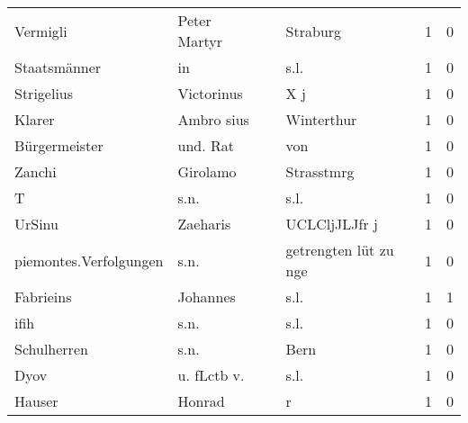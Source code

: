\begin{tabular}{llllrr}
                 Vermigli &                       Peter Martyr &             &                                    Straburg &          1 &         0 \\
             Staatsmänner &                                 in &             &                                        s.l. &          1 &         0 \\
               Strigelius &                         Victorinus &             &                                         X j &          1 &         0 \\
                   Klarer &                         Ambro sius &             &                                  Winterthur &          1 &         0 \\
            Bürgermeister &                           und. Rat &             &                                         von &          1 &         0 \\
                   Zanchi &                           Girolamo &             &                                  Strasstmrg &          1 &         0 \\
                        T &                               s.n. &             &                                        s.l. &          1 &         0 \\
                   UrSinu &                           Zaeharis &             &                               UCLCljJLJfr j &          1 &         0 \\
   piemontes.Verfolgungen &                               s.n. &             &                       getrengten lüt zu nge &          1 &         0 \\
                Fabrieins &                           Johannes &             &                                        s.l. &          1 &         1 \\
                     ifih &                               s.n. &             &                                        s.l. &          1 &         0 \\
              Schulherren &                               s.n. &             &                                        Bern &          1 &         0 \\
                     Dyov &                        u. fLctb v. &             &                                        s.l. &          1 &         0 \\
                   Hauser &                             Honrad &             &                                           r &          1 &         0 \\

\end{tabular}
